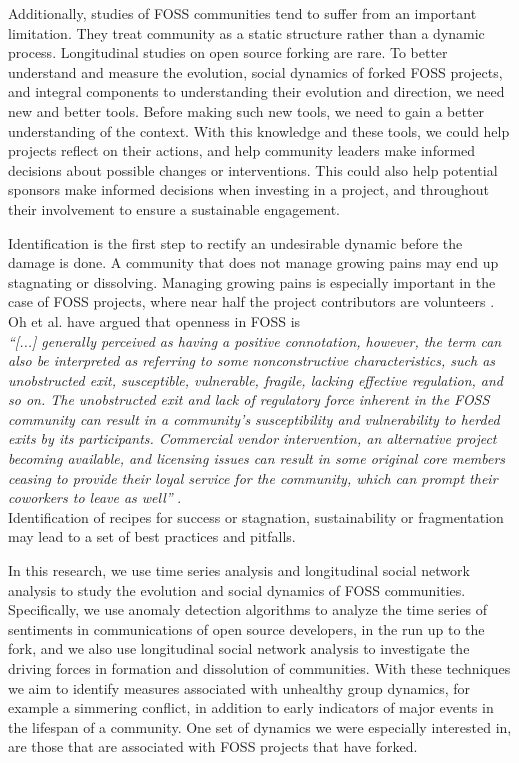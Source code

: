 \documentclass[12pt,letterpaper]{gthesis2}  %
\begin{document}
Additionally, studies of FOSS communities tend to suffer from an important limitation. They treat community as a static structure rather than a dynamic process. Longitudinal studies on open source forking are rare. To better understand and measure the evolution, social dynamics of forked FOSS projects, and integral components to understanding their evolution and direction, we need new and better tools. Before making such new tools, we need to gain a better understanding of the context. With this knowledge and these tools, we could help projects reflect on their actions, and help community leaders make informed decisions about possible changes or interventions. This could also help potential sponsors make informed decisions when investing in a project, and throughout their involvement to ensure a sustainable engagement. 

Identification is the first step to rectify an undesirable dynamic before the damage is done. A community that does not manage growing pains may end up stagnating or dissolving. Managing growing pains is especially important in the case of FOSS projects, where near half the project contributors are volunteers \cite{Forrest}. Oh et al. \cite{Oh} have argued that openness in FOSS is\\ \indent  \textit{``[...] generally perceived as having a positive connotation, however, the term can also be interpreted as referring to some nonconstructive characteristics, such as unobstructed exit, susceptible, vulnerable, fragile, lacking effective regulation, and so on. The unobstructed exit and lack of regulatory force inherent in the FOSS community can result in a community's susceptibility and vulnerability to herded exits by its participants. Commercial vendor intervention, an alternative project becoming available, and licensing issues can result in some original core members ceasing to provide their loyal service for the community, which can prompt their coworkers to leave as well''} \cite{Oh}.\\ Identification of recipes for success or stagnation, sustainability or fragmentation may lead to a set of best practices and pitfalls.

In this research, we use time series analysis and longitudinal social network analysis to study the evolution and social dynamics of FOSS communities. Specifically, we use anomaly detection algorithms to analyze the time series of sentiments in communications of open source developers, in the run up to the fork, and we also use longitudinal social network analysis to investigate the driving forces in formation and dissolution of communities. With these techniques we aim to identify measures associated with unhealthy group dynamics, for example a simmering conflict, in addition to early indicators of major events in the lifespan of a community. One set of dynamics we were especially interested in, are those that are associated with FOSS projects that have forked.
\end{document}
